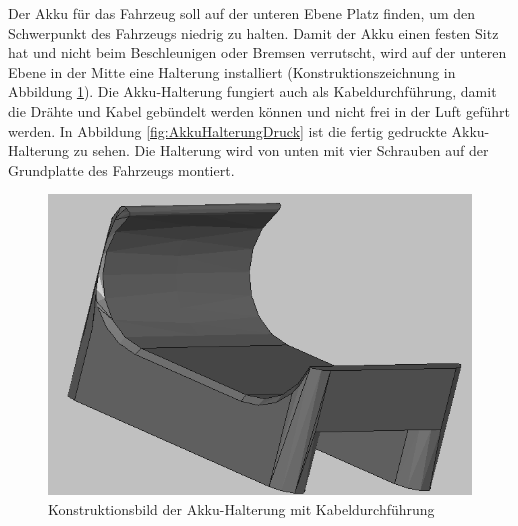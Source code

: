 Der Akku für das Fahrzeug soll auf der unteren Ebene Platz finden, um den Schwerpunkt des Fahrzeugs niedrig zu halten. Damit der Akku einen festen Sitz hat und nicht beim Beschleunigen oder Bremsen verrutscht, wird auf der unteren Ebene in der Mitte eine Halterung installiert (Konstruktionszeichnung in Abbildung \ref{fig:AkkuHalterungKonstruktion}). Die Akku-Halterung fungiert auch als Kabeldurchführung, damit die Drähte und Kabel gebündelt werden können und nicht frei in der Luft geführt werden. In Abbildung \ref{fig:AkkuHalterungDruck} ist die fertig gedruckte Akku-Halterung zu sehen. Die Halterung wird von unten mit vier Schrauben auf der Grundplatte des Fahrzeugs montiert.

\begin{minipage}[b]{0.49\textwidth}
\centering
\begin{figure}[H] %
\includegraphics[width=.85\textwidth]{sec2/images/3DAnbaukomponenten/Konstruktionsbilder/AkkuHalterungKonstruktion} 
\centering
\captionsetup{width=.9\textwidth}
\caption[Konstruktionsbild der Akku-Halterung]{Konstruktionsbild der Akku-Halterung mit Kabeldurchführung}\centering
\label{fig:AkkuHalterungKonstruktion}
\end{figure}
\end{minipage}
